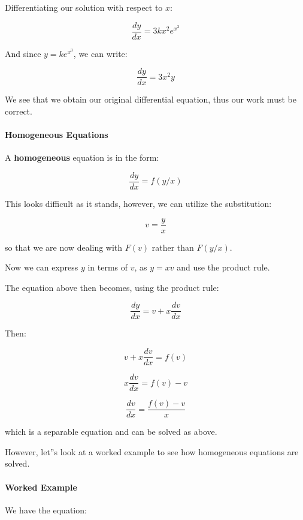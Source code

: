 Differentiating our solution with respect to $x$:

$$\frac{dy}{dx} = 3kx^2e^{x^3}$$



And since $y = ke^{x^3}$, we can write:

$$\frac{dy}{dx} = 3x^2y$$



We see that we obtain our original differential equation, thus our work must be correct.



\paragraph{Homogeneous Equations}

A \textbf{homogeneous} equation is in the form:

$$\frac{dy}{dx} = f(y/x)$$



This looks difficult as it stands, however, we can utilize the substitution:

$$v = \frac{y}{x}$$



so that we are now dealing with $F(v)$ rather than $F(y/x)$.



Now we can express $y$ in terms of $v$, as $y = xv$ and use the product rule.



The equation above then becomes, using the product rule:

$$\frac{dy}{dx} = v + x\frac{dv}{dx}$$



Then:

$$v + x\frac{dv}{dx} = f(v)$$

$$x\frac{dv}{dx} = f(v) - v$$

$$\frac{dv}{dx} = \frac{f(v) - v}{x}$$



which is a separable equation and can be solved as above.



However, let''s look at a worked example to see how homogeneous equations are solved.



\paragraph{Worked Example}

We have the equation:

